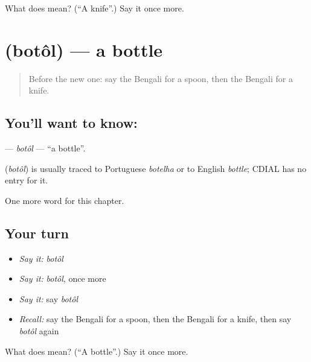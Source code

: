 \begin{tcolorbox}[breakable,colback=teal!4,colframe=teal!35!black,title={Before you move on}]
What does  mean? (\textquotedblleft{}A knife\textquotedblright{}.) Say it once more.
\end{tcolorbox}
\section[\texorpdfstring{\bn{বোতল} (botôl)}{বোতল (botôl)}]{ (botôl) — a bottle}

\label{lesson:BN-C63-botol}



\begin{quote}
Before the new one: say the Bengali for a spoon, then the Bengali for a knife.
\end{quote}

\subsection*{You'll want to know: }
\textbf{} — \emph{botôl} — \textquotedblleft{}a bottle\textquotedblright{}.

\begin{cousinweb}
\textbf{} (\emph{botôl}) is usually traced to Portuguese \emph{botelha} or to English \emph{bottle}; CDIAL has no entry for it.
\end{cousinweb}

\begin{grammarlens}[title={What you've built}]
One more word for this chapter.
\end{grammarlens}

\subsection*{Your turn}
\begin{itemize}
\raggedright
  \item \emph{Say it:} \emph{botôl}
  \item \emph{Say it:} \emph{botôl}, once more
  \item \emph{Say it:} say \emph{botôl}
  \item \emph{Recall:} say the Bengali for a spoon, then the Bengali for a knife, then say \emph{botôl} again
\end{itemize}

\begin{tcolorbox}[breakable,colback=teal!4,colframe=teal!35!black,title={Before you move on}]
What does  mean? (\textquotedblleft{}A bottle\textquotedblright{}.) Say it once more.
\end{tcolorbox}
